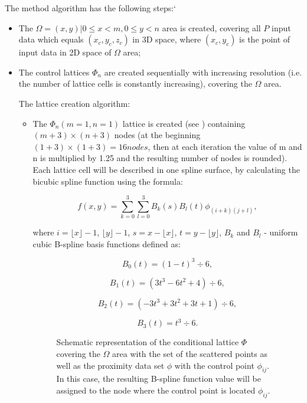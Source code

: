 The method algorithm has the following steps:`
\begin{itemize}
	\item 
	The $ \Omega = {(x,y) | 0 \le x < m, 0 \le y < n} $ area is created, covering all $ P $ input data which equals $ {(x_{c},y_{c},z_{c})} $ in 3D space, where $ (x_{c},y_{c}) $ is the point of input data in 2D space of $ \Omega $ area; 
	\item 
	The control lattices $ \Phi_{n} $ are created sequentially with increasing resolution (i.e. the number of lattice cells is constantly increasing), covering the $ \Omega $ area. 
	
	The lattice creation algorithm:
	\begin{itemize}
		\item 
		The $ \Phi_{n} (m=1, n=1) $ lattice is created (see ) containing $ (m+3)\times(n+3) $ nodes (at the beginning $ (1+3)\times(1+3) = 16 nodes $, then at each iteration the value of m and n is multiplied by 1.25 and the resulting number of nodes is rounded). Each lattice cell will be described in one spline surface, by calculating the bicubic spline function using the formula:
		
		$$
		f(x,y) = \sum_{k=0}^3 \sum_{l=0}^3 B_{k}(s)B_{l}(t)\phi_{(i+k)(j+l)},
		$$
		
		where $ i = \lfloor x \rfloor -1 $, $ \lfloor y \rfloor -1 $, $ s= x - \lfloor x \rfloor $, $ t = y - \lfloor y \rfloor $, $ B_{k} $ and $ B_{l} $ - uniform cubic B-spline basis functions defined as:
		
		$$
		B_{0}(t) = (1-t)^3 \div 6,
		$$
		
		$$
		B_{1}(t) = (3t^3 - 6t^2 + 4) \div 6,
		$$
		
		$$
		B_{2}(t) = (-3t^3 +3t^2 +3t + 1) \div 6,
		$$
		
		$$
		B_{3}(t) = t^3 \div 6.
		$$
		
		\begin{figure}[h]
			\caption{Schematic representation of the conditional lattice $ \Phi $ covering the $ \Omega $ area with the set of the scattered points as well as the proximity data set $ \phi $ with the control point $ \phi_{ij} $. In this case, the resulting B-spline function value will be assigned to the node where the control point is located $ \phi_{ij} $.}
			\label{ris:phi_lattice}
		\end{figure} 
		
		\clearpage
		

\end{itemize}
\end{itemize}
